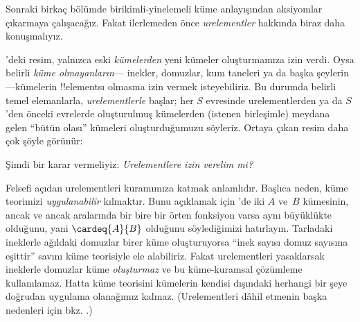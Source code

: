 


Sonraki birkaç bölümde birikimli-yinelemeli küme anlayışından aksiyomlar
çıkarmaya çalışacağız. Fakat ilerlemeden önce \emph{urelementler} hakkında
biraz daha konuşmalıyız.

'deki resim, yalnızca eski \emph{kümelerden} yeni
kümeler oluşturmamıza izin verdi. Oysa belirli \emph{küme olmayanların}---
inekler, domuzlar, kum taneleri ya da başka şeylerin---kümelerin !!{element}s{}ı
olmasına izin vermek isteyebiliriz. Bu durumda belirli temel elemanlarla,
\emph{urelementlerle} başlar; her $S$ evresinde urelementlerden ya da
$S$'den önceki evrelerde oluşturulmuş kümelerden (istenen birleşimle) meydana
gelen ``bütün olası'' kümeleri oluşturduğumuzu söyleriz. Ortaya çıkan resim
daha çok şöyle görünür:
\begin{center}
\end{center}
Şimdi bir karar vermeliyiz: \emph{Urelementlere izin verelim mi?}

Felsefi açıdan urelementleri kuramımıza katmak anlamlıdır. Başlıca neden,
küme teorimizi \emph{uygulanabilir} kılmaktır. Bunu açıklamak için
'de iki $A$ ve~$B$ kümesinin, ancak ve ancak
aralarında bir bire bir örten fonksiyon varsa aynı büyüklükte olduğunu,
yani $\cardeq{A}{B}$ olduğunu söylediğimizi hatırlayın. Tarladaki ineklerle
ağıldaki domuzlar birer küme oluşturuyorsa ``inek sayısı domuz sayısına
eşittir'' savını küme teorisiyle ele alabiliriz. Fakat urelementleri
yasaklarsak ineklerle domuzlar küme \emph{oluşturmaz} ve bu küme-kuramsal
çözümleme kullanılamaz. Hatta küme teorisini kümelerin kendisi dışındaki
herhangi bir şeye doğrudan uygulama olanağımız kalmaz. (Urelementleri dâhil
etmenin başka nedenleri için bkz. \citealt[pp.~vi, 24, 50--1]{Potter2004}.)

